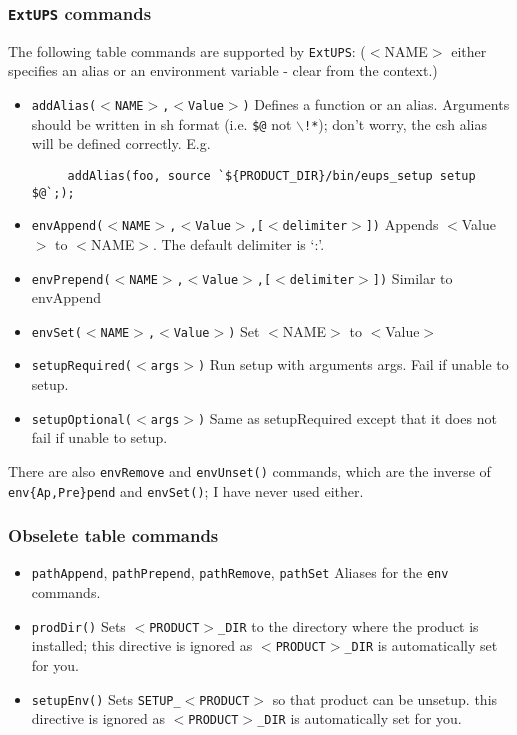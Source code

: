 \documentclass{article}
\newcommand{\code}[1]{\texttt{#1}}
\newcommand{\eups}{\code{ExtUPS}}
\begin{document}
\subsubsection{\eups{} commands}

The following table commands are supported by \eups{}: ($<$NAME$>$ either specifies an
alias or an environment variable - clear from the context.)

\begin{itemize}
   \item \code{addAlias($<$NAME$>$,$<$Value$>$)}
     Defines a function or an alias.  Arguments should be written in
     sh format (i.e. \code{\$@} not \code{$\backslash$!*}); don't worry,
     the csh alias will be defined correctly.  E.g.
     \begin{verbatim}
     addAlias(foo, source `${PRODUCT_DIR}/bin/eups_setup setup $@`;);
     \end{verbatim}
    
   \item \code{envAppend($<$NAME$>$,$<$Value$>$,[$<$delimiter$>$])}
     Appends $<$Value$>$ to $<$NAME$>$. The default delimiter is `:'.
     
   \item \code{envPrepend($<$NAME$>$,$<$Value$>$,[$<$delimiter$>$])}
     Similar to envAppend
     
   \item \code{envSet($<$NAME$>$,$<$Value$>$)}
     Set $<$NAME$>$ to $<$Value$>$
     
   \item \code{setupRequired($<$args$>$)}
     Run setup with arguments args. Fail if unable to setup.
     
   \item \code{setupOptional($<$args$>$)}
     Same as setupRequired except that it does not fail if unable to setup.
\end{itemize}

There are also \code{envRemove} and \code{envUnset()} commands, which
are the inverse of \code{env\{Ap,Pre\}pend} and \code{envSet()}; I have
never used either.     

\subsubsection{Obselete table commands}

\begin{itemize}
   \item \code{pathAppend}, \code{pathPrepend}, \code{pathRemove}, \code{pathSet}
     Aliases for the \code{env} commands.
     
   \item \code{prodDir()}
     Sets \code{$<$PRODUCT$>$\_DIR} to the directory where the product is installed;
     this directive is ignored as \code{$<$PRODUCT$>$\_DIR} is automatically set for you.
     
   \item \code{setupEnv()}
     Sets \code{SETUP\_$<$PRODUCT$>$} so that product can be unsetup.
     this directive is ignored as \code{$<$PRODUCT$>$\_DIR} is automatically set for you.
\end{itemize}
        
\end{document}
